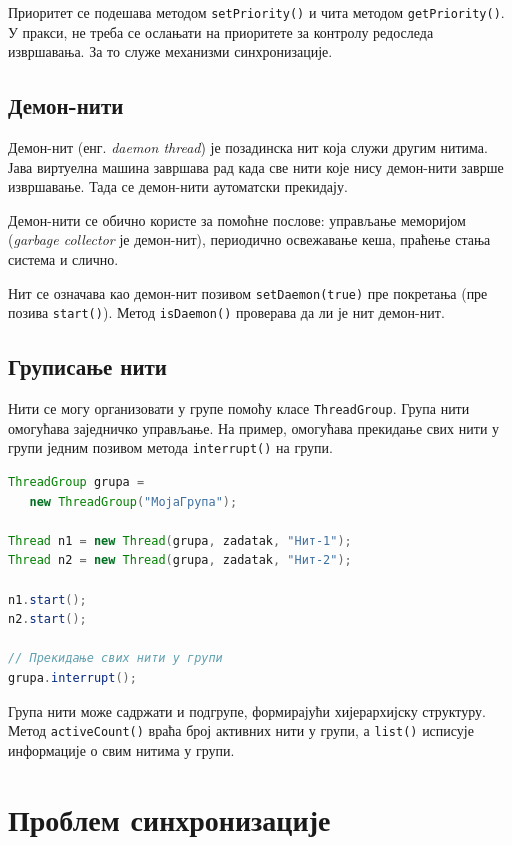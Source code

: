 Приоритет се подешава методом \texttt{setPriority()} и чита методом \texttt{getPriority()}. У пракси, не треба се ослањати на приоритете за контролу редоследа извршавања. За то служе механизми синхронизације.


\subsection{Демон-нити}

Демон-нит (енг. \textit{daemon thread}) је позадинска нит која служи другим нитима. Јава виртуелна машина завршава рад када све нити које нису демон-нити заврше извршавање. Тада се демон-нити аутоматски прекидају.

Демон-нити се обично користе за помоћне послове: управљање меморијом (\textit{garbage collector} је демон-нит), периодично освежавање кеша, праћење стања система и слично.

Нит се означава као демон-нит позивом \texttt{setDaemon(true)} пре покретања (пре позива \texttt{start()}). Метод \texttt{isDaemon()} проверава да ли је нит демон-нит.


\subsection{Груписање нити}

Нити се могу организовати у групе помоћу класе \texttt{ThreadGroup}. Група нити омогућава заједничко управљање. На пример, омогућава прекидање свих нити у групи једним позивом метода \texttt{interrupt()} на групи.


\begin{lstlisting}[language=Java]
ThreadGroup grupa =
   new ThreadGroup("МојаГрупа");
 
Thread n1 = new Thread(grupa, zadatak, "Нит-1");
Thread n2 = new Thread(grupa, zadatak, "Нит-2");
 
n1.start();
n2.start();
 
// Прекидање свих нити у групи
grupa.interrupt();
\end{lstlisting}


Група нити може садржати и подгрупе, формирајући хијерархијску структуру. Метод \texttt{activeCount()} враћа број активних нити у групи, а \texttt{list()} исписује информације о свим нитима у групи.


\section{Проблем синхронизације}

